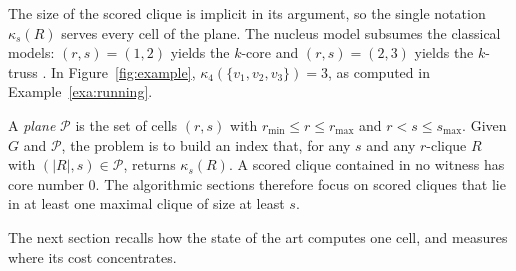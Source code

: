 The size of the scored clique is implicit in its argument, so the single notation $\kappa_s(R)$ serves every cell of the plane.
%
The nucleus model subsumes the classical models: $(r,s)=(1,2)$ yields the $k$-core \cite{seidman1983network} and $(r,s)=(2,3)$ yields the $k$-truss \cite{cohen2008trusses,firstNucleus}.
%
In Figure~\ref{fig:example}, $\kappa_4(\{v_1,v_2,v_3\})=3$, as computed in Example~\ref{exa:running}.

A \emph{plane} $\mathcal{P}$ is the set of cells $(r,s)$ with $r_{\min}\le r\le r_{\max}$ and $r<s\le s_{\max}$.
%
Given $G$ and $\mathcal{P}$, the problem is to build an index that, for any $s$ and any $r$-clique $R$ with $(|R|,s)\in\mathcal{P}$, returns $\kappa_s(R)$.
%
A scored clique contained in no witness has core number $0$.
%
The algorithmic sections therefore focus on scored cliques that lie in at least one maximal clique of size at least $s$.

The next section recalls how the state of the art computes one cell, and measures where its cost concentrates.
